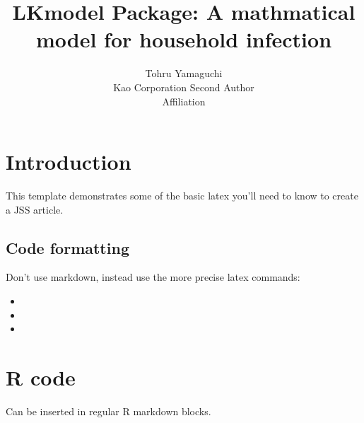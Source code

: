 \documentclass[article]{jss}
\author{
Tohru Yamaguchi\\Kao Corporation \And Second Author\\Affiliation
}
\title{LKmodel Package: A mathmatical model for household infection
\pkg{LKmodel}}
\begin{document}
\hypertarget{introduction}{%
\section{Introduction}\label{introduction}}

This template demonstrates some of the basic latex you'll need to know
to create a JSS article.

\hypertarget{code-formatting}{%
\subsection{Code formatting}\label{code-formatting}}

Don't use markdown, instead use the more precise latex commands:

\begin{itemize}
\item
\item
\item
\end{itemize}

\hypertarget{r-code}{%
\section{R code}\label{r-code}}

Can be inserted in regular R markdown blocks.
\end{document}
